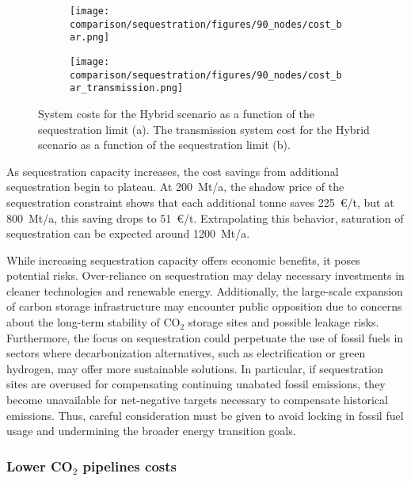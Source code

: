 \documentclass[twocolumn]{article}
\newcommand{\carbon}{CO$_2$}
\newcommand{\hybridscenario}{Hybrid scenario}
\begin{document}
\begin{figure}[ht!]
    \centering
    \begin{subfigure}{.5\textwidth}
        \texttt{[image: comparison/sequestration/figures/90\_nodes/cost\_bar.png]}
        \caption[short]{}
        \label{fig:sequestration_cost_bar}
    \end{subfigure}%
    \begin{subfigure}{.5\textwidth}
        \texttt{[image: comparison/sequestration/figures/90\_nodes/cost\_bar\_transmission.png]}
        \caption[short]{}
        \label{fig:sequestration_cost_bar_transmission}
    \end{subfigure}
    \caption{System costs for the \hybridscenario{} as a function of the sequestration limit (a). The transmission system cost for the \hybridscenario{} as a function of the sequestration limit (b).}
\end{figure}




As sequestration capacity increases, the cost savings from additional sequestration begin to plateau. At 200~Mt/a, the shadow price of the sequestration constraint shows that each additional tonne saves 225~€/t, but at 800~Mt/a, this saving drops to 51~€/t. Extrapolating this behavior, saturation of sequestration can be expected around 1200~Mt/a.

While increasing sequestration capacity offers economic benefits, it poses potential risks. Over-reliance on sequestration may delay necessary investments in cleaner technologies and renewable energy. Additionally, the large-scale expansion of carbon storage infrastructure may encounter public opposition due to concerns about the long-term stability of CO$_2$ storage sites and possible leakage risks. Furthermore, the focus on sequestration could perpetuate the use of fossil fuels in sectors where decarbonization alternatives, such as electrification or green hydrogen, may offer more sustainable solutions. In particular, if sequestration sites are overused for compensating continuing unabated fossil emissions, they become unavailable for net-negative targets necessary to compensate historical emissions. Thus, careful consideration must be given to avoid locking in fossil fuel usage and undermining the broader energy transition goals.




\subsubsection{Lower \carbon{} pipelines costs}
\label{sec:subsidy}
\end{document}
